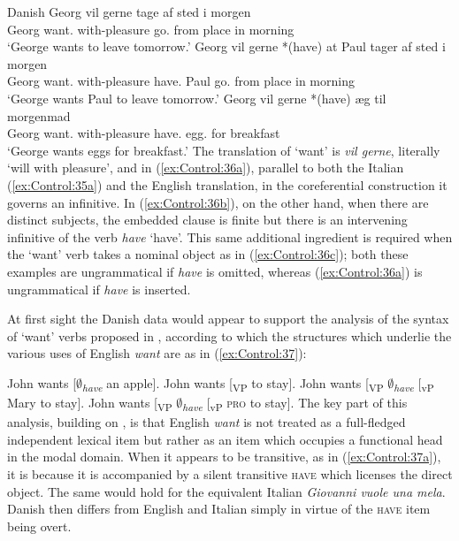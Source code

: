 \documentclass[output=paper,hidelinks]{langscibook}
\begin{document}
\ea\label{ex:Control:36}Danish
\ea\label{ex:Control:36a}\gll Georg vil    gerne    tage  af  sted i morgen\\
 Georg   {want.\PRS} with-pleasure {go.\INF} from place in morning\\
\glt `George wants to leave tomorrow.' 
\ex\label{ex:Control:36b}\gll Georg vil    gerne    *(have)  at  Paul tager af  sted i morgen\\
Georg   {want.\PRS} with-pleasure {have.\INF}    Paul  {go.\PRS} from place in morning\\
\glt`George wants Paul to leave tomorrow.'
\ex\label{ex:Control:36c}\gll Georg vil    gerne    *(have)  {\ae}g   til  morgenmad\\
    Georg   {want.\PRS} with-pleasure {have.\INF}  {egg.\PL} for  breakfast\\
    \glt`George wants eggs for breakfast.'
\z\z
The translation of `want' is \emph{vil gerne}, literally `will with pleasure', and in (\ref{ex:Control:36a}), parallel to both the Italian (\ref{ex:Control:35a}) and the English translation, in the coreferential construction it governs an infinitive. In (\ref{ex:Control:36b}), on the other hand, when there are distinct subjects, the embedded clause is finite but there is an intervening infinitive of the verb \emph{have} `have'. This same additional ingredient is required when the `want' verb takes a nominal object as in (\ref{ex:Control:36c}); both these examples are ungrammatical if \emph{have} is omitted, whereas (\ref{ex:Control:36a}) is ungrammatical if \emph{have} is inserted.

At first sight the Danish data would appear to support the analysis of the syntax of `want' verbs proposed in \citet[83]{Grano2015}, according to which the structures which underlie the various uses of English \emph{want} are as in (\ref{ex:Control:37}):

\ea\label{ex:Control:37}
\ea\label{ex:Control:37a} John wants [$\emptyset$\textsubscript{\textit{have}} an apple].
\ex\label{ex:Control:37b} John wants [\textsubscript{VP} to stay].
\ex\label{ex:Control:37c} John wants [\textsubscript{VP} $\emptyset$\textsubscript{\textit{have}} [\textsubscript{vP} Mary to stay].
\ex\label{ex:Control:37d} John wants [\textsubscript{VP} $\emptyset$\textsubscript{\textit{have}} [\textsubscript{vP} \textsc{pro} to stay].
\z\z
The key part of this analysis, building on \citet{Cinque2004}, is that English \emph{want} is not treated as a full-fledged independent lexical item but rather as an item which occupies a functional head in the modal domain. When it appears to be transitive, as in (\ref{ex:Control:37a}), it is because it is accompanied by a silent transitive \textsc{have} which licenses the direct object. The same would hold for the equivalent Italian \emph{Giovanni vuole una mela}. Danish then differs from English and Italian simply in virtue of the \textsc{have} item being overt.
\end{document}
